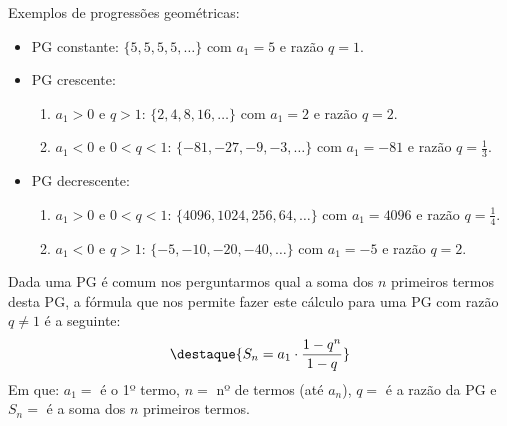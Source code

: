  \begin{exem} Exemplos de progressões geométricas:
  \begin{itemize}
   \item PG constante: $\{5, 5, 5, 5, \ldots \}$ com $a_1= 5$ e razão $q= 1$.
   \item PG crescente:
   \begin{enumerate}
   \item $a_1 > 0$ e $q > 1$: $\{2, 4, 8, 16, \ldots \}$ com $a_1= 2$ e razão $q= 2$.
   \item $a_1 < 0$ e $0 < q < 1$: $\{-81, -27, -9, -3, \ldots \}$ com $a_1= -81$ e razão $q= \frac{1}{3}$.
   \end{enumerate}
   \item PG decrescente:
    \begin{enumerate}
   \item $a_1 > 0$ e $0 < q < 1$: $\{4096, 1024, 256, 64, \ldots \}$ com $a_1= 4096$ e razão $q= \frac{1}{4}$.
   \item $a_1 < 0$ e $q > 1$: $\{-5, -10, -20, -40, \ldots \}$ com $a_1= -5$ e razão $q= 2$.
   \end{enumerate}
  \end{itemize}
 \end{exem}

 Dada uma PG é comum nos perguntarmos qual a soma dos $n$ primeiros termos desta PG, a fórmula que nos permite fazer este cálculo para uma PG com razão $q \neq 1$ é a seguinte:
 \[\destaque{S_n= a_1 \cdot \frac{ 1 - q^n}{1 - q}}\]
 Em que: $a_1=$ é o 1º termo, $n=$ nº de termos (até $a_n$), $q=$ é a razão da PG e $S_n=$ é a soma dos $n$ primeiros termos.

\newpage
